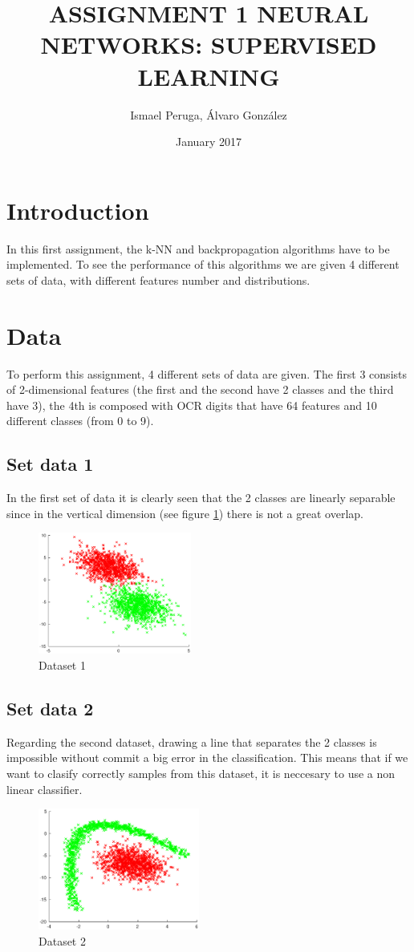 \documentclass{article}
\title{ASSIGNMENT 1 NEURAL NETWORKS: SUPERVISED LEARNING}
\author{Ismael Peruga, Álvaro González}
\date{January 2017}
\begin{document}
\maketitle
\section{Introduction}
In this first assignment, the k-NN and backpropagation algorithms have to be implemented. To see the performance of this algorithms we are given 4 different sets of data, with different features number and distributions.

\section{Data}
To perform this assignment, 4 different sets of data are given. The first 3 consists of 2-dimensional features (the first and the second have 2 classes and the third have 3), the 4th is composed with OCR digits that have 64 features and 10 different classes (from 0 to 9).

\subsection{Set data 1}
In the first set of data it is clearly seen that the 2 classes are linearly separable since in the vertical dimension (see figure \ref{fig:dataset1}) there is not a great overlap.
\begin{figure}[H]
\centering
\includegraphics[height=4cm]{images/dataset1}
\caption{Dataset 1}
\label{fig:dataset1}
\end{figure}

\subsection{Set data 2}
Regarding the second dataset, drawing a line that separates the 2 classes is impossible without commit a big error in the classification. This means that if we want to clasify correctly samples from this dataset, it is neccesary to use a non linear classifier. 
\begin{figure}[H]
\centering
\includegraphics[height=4cm]{images/dataset2}
\caption{Dataset 2}
\label{fig:dataset2}
\end{figure}
\end{document}
